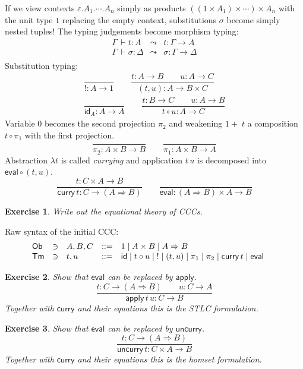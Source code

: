 \documentclass[a4paper,fleqn]{scrartcl}
\newtheorem{exercise}{Exercise}
\newcommand{\Ob}{\mathsf{Ob}}
\newcommand{\tid}{\mathsf{id}}
\newcommand{\comp}{\circ}
\newcommand{\To}{\Rightarrow}
\newcommand{\too}{\longrightarrow}
\newcommand{\tcurry}{\mathsf{curry}}
\newcommand{\tuncurry}{\mathsf{uncurry}}
\newcommand{\tapply}{\mathsf{apply}}
\newcommand{\teval}{\mathsf{eval}}
\newcommand{\der}{\,\vdash}
\newcommand{\ru}[2]{\dfrac{#1}{#2}}
\newcommand{\Tm}{\mathsf{Tm}}
\newcommand{\Ge}{\ensuremath{\varepsilon}}
\newcommand{\Gs}{\ensuremath{\sigma}}
\begin{document}
If we view contexts $\Ge.A_1.\cdots.A_n$ simply as products
$((1 \times A_1) \times \cdots) \times A_n$ with the unit type $1$
replacing the empty context, substitutions $\Gs$ become simply nested
tuples!  The typing judgements become morphism typing:
\[
\begin{array}{lcl}
  \Gamma \der t : A & \leadsto & t : \Gamma \too A \\
  \Gamma \der \Gs : \Delta & \leadsto & \Gs : \Gamma \too \Delta \\
\end{array}
\]
Substitution typing:
\begin{gather*}
  \ru{}{! : A \to 1}
\qquad
  \ru{t : A \to B \qquad u : A \to C
    }{(t,u) : A \to B \times C}
\\[2ex]
  \ru{}{\tid_A : A \too A}
\qquad
  \ru{t : B \too C \qquad u : A \too B}{t \comp u : A \too C}
\end{gather*}
Variable $0$ becomes the second projection $\pi_2$ and weakening ${1+}\;t$ a composition $t \comp \pi_1$ with the first projection.
\[
  \ru{}{\pi_2 : A \times B \too B}
\qquad
  \ru{}{\pi_1 : A \times B \too A}
\]
Abstraction $\lambda t$ is called \emph{currying} and application $t\,u$ is decomposed into $\teval \comp (t,u)$.
\[
  \ru{t : C \times A \too B}{\tcurry\,t : C \too (A \To B)}
\qquad
  \ru{}{\teval : (A \To B) \times A \too B}
\]
\begin{exercise}
Write out the equational theory of CCCs.
\end{exercise}


Raw syntax of the initial CCC:
\[
\begin{array}{lllrl@{\qquad}l}
\Ob & \ni & A,B,C & ::= & 1 \mid A \times B \mid A \To B \\
\Tm & \ni & t,u   & ::= & \tid \mid t \comp u \mid {!} \mid (t,u) \mid \pi_1 \mid \pi_2 \mid \tcurry\,t \mid \teval \\
\end{array}
\]

\begin{exercise}
Show that $\teval$ can be replaced by $\tapply$.
\[
\ru{t : C \too (A \To B) \qquad u : C \too A}{\tapply\,t\,u : C \too B}
\]
Together with $\tcurry$ and their equations this is the STLC formulation.
\end{exercise}
\begin{exercise}
Show that $\teval$ can be replaced by $\tuncurry$.
\[
\ru{t : C \too (A \To B)}{\tuncurry\,t : C \times A \too B}
\]
Together with $\tcurry$ and their equations this is the homset formulation.
\end{exercise}
\end{document}
